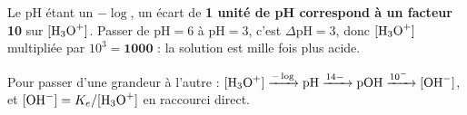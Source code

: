 \documentclass[11pt,a4paper]{article}
\begin{document}
\begin{remarque}[une unité de pH = un facteur 10]
Le pH étant un $-\log$, un écart de \textbf{1 unité de pH correspond à un facteur 10} sur $[\ce{H3O+}]$.
Passer de $\mathrm{pH}=6$ à $\mathrm{pH}=3$, c'est $\Delta\mathrm{pH}=3$, donc
$[\ce{H3O+}]$ multipliée par $10^{3}=\mathbf{1000}$ : la solution est mille fois plus acide.
\end{remarque}

\begin{methode}
Pour passer d'une grandeur à l'autre : $[\ce{H3O+}] \xrightarrow{-\log} \mathrm{pH}
\xrightarrow{14-\ } \mathrm{pOH} \xrightarrow{10^{-\ }} [\ce{OH-}]$, et
$[\ce{OH-}] = K_e/[\ce{H3O+}]$ en raccourci direct.
\end{methode}
\end{document}
